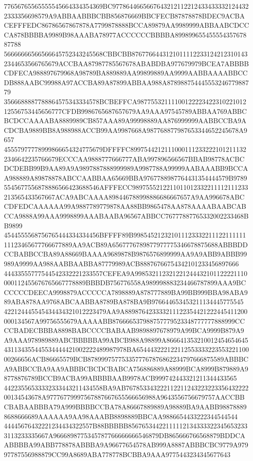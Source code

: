 77656765565555545664334354369BC97786446656676432121122124334333321244322333356698579A9ABBAABBBCBB856876669BBCFECB87878878BDEC9ACBACEFFFEDC86786567867878A7799878888BCCA89879AA9989999ABBAABCDCCCA878BBBBA9989B98AAABA78977ACCCCCCBBBBA89989965545555435767887788
56666666566566645752343245568CBBCBB87677664431210111122331242123101432344653566765679ACCBAA87987785567678ABABDBA977679979BCEA7ABBBBCDFECA988897679968A98789BA889889AA99899889AA9999AABBAAAABBCCDB888AABC99988A97ACCBA89A87899ABBAA988A87898875444555324677988779
3566688887788864575343334578BCBEFFCA9877553211110012222342231022101212556753445656777CFDB9986765687657679AA9AAA97545789ABBAA769ABBCBCDCCAAAABA8889989CB857AAA89A99998889AA876999999AABBCCBA9ACDCBA9889BB8A988988ACCB99AA9987668A987768877987653344652245678A9657
45557977778999866654324775679DFFFFC89975442121110001112332221012111322346642235766679ECCCAA9888777666777ABA997896566567BBAB98778ACBCDCDEBB99B9AA89A9A9897887888999989A9987788A99999AABAAABB9BCCAA988889A89878878ABCCAABBAA65669BBA9767788987764431354444579B9789
5545677556878886566423688546AFFFECC9897555212211011012332211112111233213565433567667ACA9ABCAAAA898446788998886686667657A9AA996678ABCCDFEDCAAAAAA99A9887789779878AA88BB9865478AA878AAAABAABCABCCA9888A99AAA9998899AAABAABA96567ABBCC76777887765332002233468BB9899
4544555568756765444334334456BFFFF89B99854521232101112333221112211111111123465677766677889AA9ACB89A6567776789877977775346678875688ABBBDDCCBABBCCBA89A88669BAAAA9689878B9876576899999AA9A9ABB9ABBB99989A9999AA988AABBAABBA87779989ACB88876766754342101233456897666
44433555777544542332221233557CEFEA9A998532112321221244432101122221110000112455676765667778889BBBDB756776558A989998883234466787899AAA9BCCCCCCDEECA9998879ACCCCCA7898889A878777889BA99BB999BBA98ABA989ABA878AA9768ABCAABBA8789BA878BA9B976644653453211134445775545
422124445545434434321012223479AA9A889876423333211122354421222445411200000134567A99756555679AAAAABB876666537988757779523348777777888999CCCCBADECBBBA8898BABCCCCBABAAB9898897678979A99BCA9999B879A9A9AAA978989889ABCBBBBBA99ABCB988A98899A866641353210012454654645
431134355445534444421002222489987978BA65444322212211255333322355322110000266656ACB86665579BCB8789997577533577767876862234797666875589ABBBCA9ABBCCBA9AA9ABBBCBCDCBABCA756886889A88999BCA8999B879889A98778876789BCCB9ACBA99ABBBBAAB9978ACB999742443321211344433565
44223556533332333443211434558BA9AB76785334322211221124322322335643222200134543678A97776779997567887667655566656988A9643556756679757AACCBBCBABAABBBA79A999BBBBCCBA78A86667889889A98889BA9AABB988788898688666689AAAAAA9AA98AAABB8898889BBCAA9886654433222344544544
44445676432221234434322557B88BBBBB856765344221111121343333223456532333113233335667A9666898775345787766666666546879DB865666766568879BDDCAABBBBA99ABB778878ABBBA9A96677654578AB999A8887ABBBCBC9779A97997787556988879CC99A8689ABA778778BCBBA9AAA9775443234345677643
